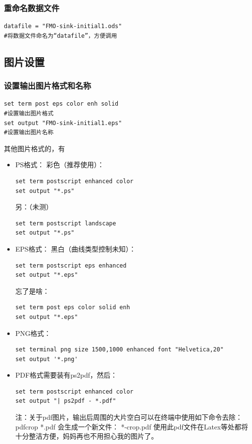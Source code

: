 \documentclass[lang=cn,10pt,newtx]{elegantbook}
\begin{document}
\subsubsection{重命名数据文件}
\begin{verbatim}
datafile = "FMO-sink-initial1.ods"
#将数据文件命名为“datafile”，方便调用
\end{verbatim}



\subsection{图片设置}
\subsubsection{设置输出图片格式和名称}
\begin{verbatim}
set term post eps color enh solid
#设置输出图片格式
set output "FMO-sink-initial1.eps"
#设置输出图片名称
\end{verbatim}

其他图片格式的，有
\begin{itemize}
\item PS格式：
彩色（推荐使用）：
\begin{verbatim}
set term postscript enhanced color
set output "*.ps"
\end{verbatim}
另：（未测）
\begin{verbatim}
set term postscript landscape
set output "*.ps"
\end{verbatim}

\item EPS格式：
黑白（曲线类型控制未知）：
\begin{verbatim}
set term postscript eps enhanced
set output "*.eps"
\end{verbatim}
忘了是啥：
\begin{verbatim}
set term post eps color solid enh
set output "*.eps"
\end{verbatim}

\item PNG格式：
\begin{verbatim}
set terminal png size 1500,1000 enhanced font "Helvetica,20"
set output '*.png'
\end{verbatim}

\item PDF格式需要装有ps2pdf，然后：
\begin{verbatim}
set term postscript enhanced color
set output "| ps2pdf - *.pdf"
\end{verbatim}

注：关于pdf图片，输出后周围的大片空白可以在终端中使用如下命令去除：
pdfcrop *.pdf
会生成一个新文件： *-crop.pdf
使用此pdf文件在Latex等处都将十分整洁方便，妈妈再也不用担心我的图片了。
\end{itemize}
\end{document}
